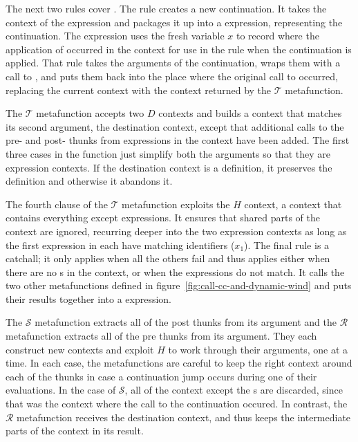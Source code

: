 The next two rules cover . The rule
 creates a new continuation. It takes the context
of the  expression and packages it up into a
 expression, representing the continuation. The
 expression uses the fresh variable $x$ to record
where the application of  occurred in the context for
use in the  rule when the continuation is applied.
That rule takes the arguments of the continuation, wraps them with a
call to , and puts them back into the place where the
original call to  occurred, replacing the current
context with the context returned by the $\mathscr{T}$ metafunction.

The $\mathscr{T}$ metafunction accepts two $D$ contexts and
builds a context that matches its second argument, the destination
context, except that additional calls to the pre- and post- thunks
from  expressions in the context have been added. The first
three cases in the function just simplify both the arguments so that
they are expression contexts. If the destination context is a
definition, it preserves the definition and otherwise it abandons it.

The fourth clause of the $\mathscr{T}$ metafunction exploits the
$H$ context, a context that contains everything except
 expressions. It ensures that shared parts of the
 context are ignored, recurring deeper into the
two expression contexts as long as the first  expression in
each have matching identifiers ($x_1$). The final rule is a
catchall; it only applies when all the others fail and thus applies
either when there are no s in the context, or when the
 expressions do not match. It calls the two other
metafunctions defined in figure~\ref{fig:call-cc-and-dynamic-wind} and
puts their results together into a  expression.

The $\mathscr{S}$ metafunction extracts all of the post thunks from
its argument and the $\mathscr{R}$ metafunction extracts all of the pre
thunks from its argument. They each construct new contexts and exploit
$H$ to work through their arguments, one  at a time.
In each case, the metafunctions are careful to keep the right
 context around each of the thunks in case a continuation
jump occurs during one of their evaluations. In the case of
$\mathscr{S}$, all of the context except the s are
discarded, since that was the context where the call to the
continuation occured. In contrast, the $\mathscr{R}$ metafunction
receives the destination context, and thus keeps the intermediate
parts of the context in its result.

